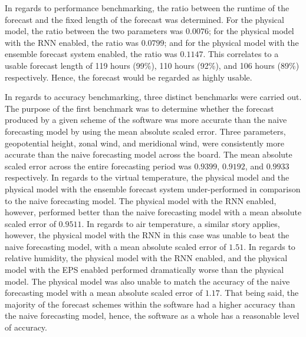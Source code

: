 \documentclass[hidelinks, 12pt]{style}
\begin{document}
In regards to performance benchmarking, the ratio between the runtime of the forecast and the fixed length of the forecast was determined. For the physical model, the ratio between the two parameters was $0.0076$; for the physical model with the RNN enabled, the ratio was $0.0799$; and for the physical model with the ensemble forecast system enabled, the ratio was $0.1147$. This correlates to a usable forecast length of 119 hours (99\%), 110 hours (92\%), and 106 hours (89\%) respectively. Hence, the forecast would be regarded as highly usable.

In regards to accuracy benchmarking, three distinct benchmarks were carried out. The purpose of the first benchmark was to determine whether the forecast produced by a given scheme of the software was more accurate than the naive forecasting model by using the mean absolute scaled error. Three parameters, geopotential height, zonal wind, and meridional wind, were consistently more accurate than the naive forecasting model across the board. The mean absolute scaled error across the entire forecasting period was $0.9399$, $0.9192$, and $0.9933$ respectively. In regards to the virtual temperature, the physical model and the physical model with the ensemble forecast system under-performed in comparison to the naive forecasting model. The physical model with the RNN enabled, however, performed better than the naive forecasting model with a mean absolute scaled error of $0.9511$. In regards to air temperature, a similar story applies, however, the physical model with the RNN in this case was unable to beat the naive forecasting model, with a mean absolute scaled error of $1.51$. In regards to relative humidity, the physical model with the RNN enabled, and the physical model with the EPS enabled performed dramatically worse than the physical model. The physical model was also unable to match the accuracy of the naive forecasting model with a mean absolute scaled error of $1.17$. That being said, the majority of the forecast schemes within the software had a higher accuracy than the naive forecasting model, hence, the software as a whole has a reasonable level of accuracy.
\end{document}
